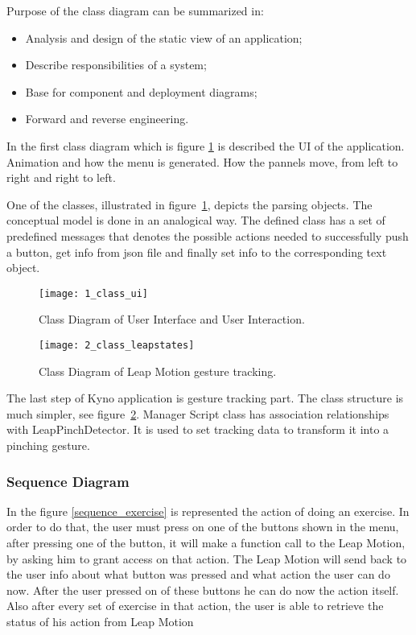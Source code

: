 Purpose of the class diagram can be summarized in:

\begin{itemize}
\item Analysis and design of the static view of an application;
\item Describe responsibilities of a system;
\item Base for component and deployment diagrams;
\item Forward and reverse engineering.
\end{itemize}

\vspace{0.2cm}

In the first class diagram which is \mbox{figure} \ref{class_ui} is described the UI of the application. Animation and how the menu is generated. How the pannels move, from left to right and right to left.

One of the classes, illustrated in \mbox{figure \ref{class_ui}}, depicts the parsing objects. The conceptual model is done in an analogical way. The defined class has a set of predefined messages that denotes the possible actions needed to successfully push a button, get info from json file and finally set info to the corresponding text object.
	



\begin{figure}[!h]
\centering
\texttt{[image: 1\_class\_ui]}
\caption{Class Diagram of User Interface and User Interaction.}\label{class_ui}
\end{figure}


\begin{figure}[!h]
\centering
\texttt{[image: 2\_class\_leapstates]}
\caption{Class Diagram of Leap Motion gesture tracking.}\label{class_leap}
\end{figure}

The last step of Kyno application is gesture tracking part. The class structure is much simpler, see \mbox{figure \ref{class_leap}}. Manager Script class has association relationships with LeapPinchDetector. It is used to set tracking data to transform it into a pinching gesture. 

\subsubsection{Sequence Diagram}
In the \mbox{figure} \ref{sequence_exercise} is represented the action of doing an exercise. In order to do that, the user must press on one of the buttons shown in the menu, after pressing one of the button, it will make a function call to the Leap Motion, by asking him to grant access on that action. The Leap Motion will send back to the user info about what button was pressed and what action the user can do now. After the user pressed on of these buttons he can do now the action itself. Also after every set of exercise in that action, the user is able to retrieve the status of his action from Leap Motion 


